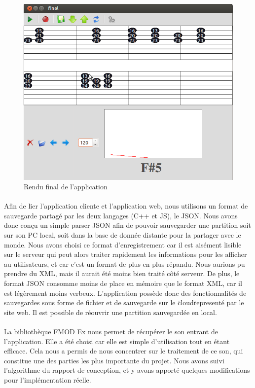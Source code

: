 \begin{figure}[H]
\centering
\includegraphics[scale=0.5]{RenduFinal}
\caption{Rendu final de l'application}
\end{figure}

\paragraph{}
Afin de lier l'application cliente et l'application web, nous utilisons un format de sauvegarde partagé par les deux 
langages (C++ et JS), le JSON. Nous avons donc conçu un simple parser JSON afin de pouvoir sauvegarder une partition 
soit sur son PC local, soit dans la base de donnée distante pour la partager avec le monde. Nous avons choisi 
ce format d'enregistrement car il est aisément lisible sur le serveur qui peut alors traiter rapidement les informations 
pour les afficher au utilisateurs, et car c'est un format de plus en plus répandu. Nous aurions pu prendre du XML, mais 
il aurait été moins bien traité côté serveur. De plus, le format JSON consomme moins de place en mémoire que le format XML,
car il est légèrement moins verbeux. L'application possède donc des fonctionnalités de sauvegardes sous forme de fichier et 
de sauvegarde sur le \"cloud\" representé par le site web. Il est possible de réouvrir une partition sauvegardée en local.

\paragraph{}
La bibliothèque FMOD Ex nous permet de récupérer le son entrant de l'application. Elle a été choisi car elle est simple 
d'utilisation tout en étant efficace. Cela nous a permis de nous concentrer sur le traitement de ce son, qui constitue 
une des parties les plus importante du projet. Nous avons suivi l'algorithme du rapport de conception, et y avons apporté 
quelques modifications pour l'implémentation réelle.

